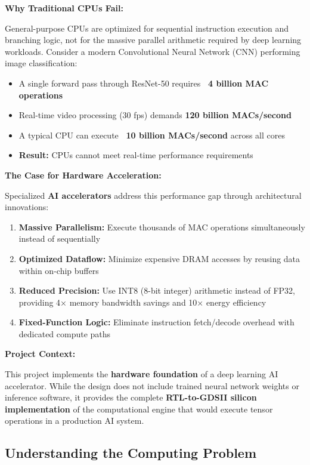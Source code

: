 \documentclass[12pt,a4paper]{article}
\begin{document}
\textbf{Why Traditional CPUs Fail:}

General-purpose CPUs are optimized for sequential instruction execution and branching logic, not for the massive parallel arithmetic required by deep learning workloads. Consider a modern Convolutional Neural Network (CNN) performing image classification:

\begin{itemize}
    \item A single forward pass through ResNet-50 requires \textbf{~4 billion MAC operations}
    \item Real-time video processing (30 fps) demands \textbf{120 billion MACs/second}
    \item A typical CPU can execute \textbf{~10 billion MACs/second} across all cores
    \item \textbf{Result:} CPUs cannot meet real-time performance requirements
\end{itemize}

\textbf{The Case for Hardware Acceleration:}

Specialized \textbf{AI accelerators} address this performance gap through architectural innovations:

\begin{enumerate}
    \item \textbf{Massive Parallelism:} Execute thousands of MAC operations simultaneously instead of sequentially
    \item \textbf{Optimized Dataflow:} Minimize expensive DRAM accesses by reusing data within on-chip buffers
    \item \textbf{Reduced Precision:} Use INT8 (8-bit integer) arithmetic instead of FP32, providing 4× memory bandwidth savings and 10× energy efficiency
    \item \textbf{Fixed-Function Logic:} Eliminate instruction fetch/decode overhead with dedicated compute paths
\end{enumerate}

\textbf{Project Context:}

This project implements the \textbf{hardware foundation} of a deep learning AI accelerator. While the design does not include trained neural network weights or inference software, it provides the complete \textbf{RTL-to-GDSII silicon implementation} of the computational engine that would execute tensor operations in a production AI system.

\subsection{Understanding the Computing Problem}
\end{document}
